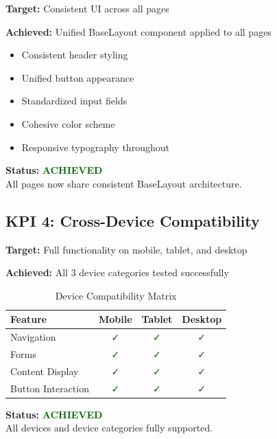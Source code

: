 \documentclass[11pt, a4paper]{report}
\begin{document}
\textbf{Target:} Consistent UI across all pages

\textbf{Achieved:} Unified BaseLayout component applied to all pages

\begin{itemize}
    \item Consistent header styling
    \item Unified button appearance
    \item Standardized input fields
    \item Cohesive color scheme
    \item Responsive typography throughout
\end{itemize}

\textbf{Status:} \textcolor{darkgreen}{\textbf{ACHIEVED}} \\
All pages now share consistent BaseLayout architecture.

\subsection{KPI 4: Cross-Device Compatibility}

\textbf{Target:} Full functionality on mobile, tablet, and desktop

\textbf{Achieved:} All 3 device categories tested successfully

\begin{table}[H]
    \centering
    \caption{Device Compatibility Matrix}
    \begin{tabular}{|l|c|c|c|}
        \hline
        \textbf{Feature} & \textbf{Mobile} & \textbf{Tablet} & \textbf{Desktop} \\
        \hline
        Navigation & \textcolor{darkgreen}{✓} & \textcolor{darkgreen}{✓} & \textcolor{darkgreen}{✓} \\
        Forms & \textcolor{darkgreen}{✓} & \textcolor{darkgreen}{✓} & \textcolor{darkgreen}{✓} \\
        Content Display & \textcolor{darkgreen}{✓} & \textcolor{darkgreen}{✓} & \textcolor{darkgreen}{✓} \\
        Button Interaction & \textcolor{darkgreen}{✓} & \textcolor{darkgreen}{✓} & \textcolor{darkgreen}{✓} \\
        \hline
    \end{tabular}
\end{table}

\textbf{Status:} \textcolor{darkgreen}{\textbf{ACHIEVED}} \\
All devices and device categories fully supported.
\end{document}
